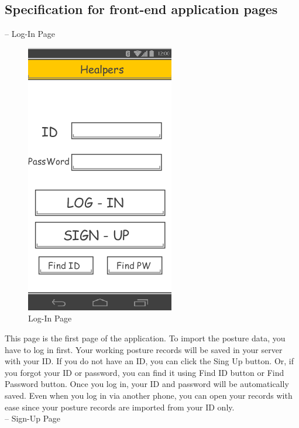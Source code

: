\documentclass[conference]{IEEEtran}
\begin{document}
\subsection{Specification for front-end application pages\\}



 --	Log-In Page\\

\begin{figure}[h]
\begin{center}
    \includegraphics[scale=1]{img_10}
    \caption{Log-In Page} 
\end{center}
\end{figure}

 This page is the first page of the application. To import the posture data, you have to log in first. Your working posture records will be saved in your server with your ID. If you do not have an ID, you can click the Sing Up  button. Or, if you forgot your ID or password, you can find it using Find ID button or Find Password button. Once you log in, your ID and password will be automatically saved. Even when you log in via another phone, you can  open your records with ease since your posture records are imported from your ID only.\\

 -- Sign-Up Page\\
 
\end{document}
